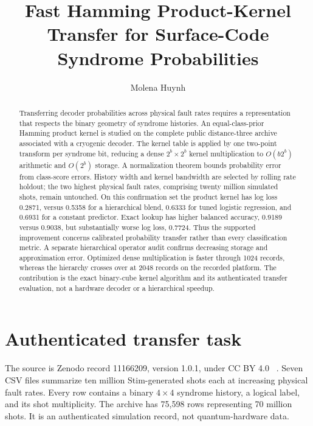 \documentclass[10pt,letterpaper,twoside]{article}
\begin{document}
\title{Fast Hamming Product-Kernel Transfer for Surface-Code Syndrome Probabilities}
\author{Molena Huynh}
\maketitle

\begin{abstract}
Transferring decoder probabilities across physical fault rates requires a
representation that respects the binary geometry of syndrome histories. An
equal-class-prior Hamming product kernel is studied on the complete public
distance-three archive associated with a cryogenic decoder. The kernel table
is applied by one two-point transform per syndrome bit, reducing a dense
$2^b\times2^b$ kernel multiplication to $O(b2^b)$ arithmetic and $O(2^b)$
storage. A normalization theorem bounds probability error from class-score
errors. History width and kernel bandwidth are selected by rolling rate
holdout; the two highest physical fault rates, comprising twenty million
simulated shots, remain untouched. On this confirmation set the product kernel
has log loss 0.2871, versus 0.5358 for a hierarchical blend, 0.6333 for tuned
logistic regression, and 0.6931 for a constant predictor. Exact lookup has
higher balanced accuracy, 0.9189 versus 0.9038, but substantially worse log
loss, 0.7724. Thus the supported improvement concerns calibrated probability
transfer rather than every classification metric. A separate hierarchical
operator audit confirms decreasing storage and approximation error. Optimized
dense multiplication is faster through 1024 records, whereas the hierarchy
crosses over at 2048 records on the recorded platform. The contribution
is the exact binary-cube kernel algorithm and its authenticated transfer
evaluation, not a hardware decoder or a hierarchical speedup.
\end{abstract}

\section{Authenticated transfer task}

The source is Zenodo record 11166209, version 1.0.1, under CC BY 4.0
~\cite{Yon2024}. Seven CSV files summarize ten million Stim-generated
shots each at increasing physical fault rates. Every row contains a binary
$4\times4$ syndrome history, a logical label, and its shot multiplicity. The
archive has 75,598 rows representing 70 million shots. It is an authenticated
simulation record, not quantum-hardware data.
\end{document}
